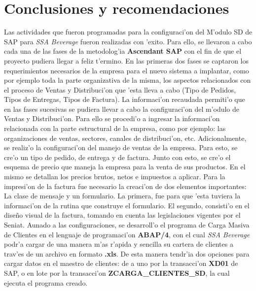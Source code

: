 \chapter{Conclusiones y recomendaciones} \label{chap:conclusiones}

	Las actividades que fueron programadas para la configuraci'on del M'odulo SD de SAP para \textit{SSA Beverage} fueron realizadas con 'exito. Para ello, se llevaron a cabo cada una de las fases de la metodolog'ia \textbf{Ascendant SAP} con el fin de que el proyecto pudiera llegar a feliz t'ermino.  En las primeras dos fases se captaron los requerimientos necesarios de la empresa para el nuevo sistema a implantar, como por ejemplo toda la parte organizativa de la misma, los aspectos relacionados con el proceso de Ventas y Distribuci'on que 'esta lleva a cabo (Tipo de Pedidos, Tipos de Entregas, Tipos de Factura). 
\newline
\newline
\indent La informaci'on recaudada permiti'o que en las fases sucesivas se pudiera llevar a cabo la configuraci'on del m'odulo de Ventas y Distribuci'on. Para ello se procedi'o a ingresar la informaci'on relacionada con la parte estructural de la empresa, como por ejemplo: las organizaciones de ventas, sectores, canales de distribuci'on, etc. Adicionalmente, se realiz'o la configuraci'on del manejo de ventas de la empresa. Para esto, se cre'o un tipo de pedido, de entrega y de factura. Junto con esto, se cre'o el esquema de precio que maneja la empresa para la venta de sus productos. En el mismo se detallan los precios brutos, netos e impuestos a aplicar. Para la impresi'on de la factura fue necesario la creaci'on de dos elementos importantes: La clase de mensaje y un formulario. La primera, fue para que 'esta tuviera la informaci'on de la rutina que construye el formulario. El segundo, consisti'o en el dise\~no visual de la factura, tomando en cuenta las legislaciones vigentes por el Seniat.
\newline
\newline
\indent Aunado a las configuraciones, se desarroll'o el programa de Carga Masiva de Clientes en el lenguaje de programaci'on \textbf{ABAP/4}, con el cual \textit{SSA Beverage} podr'a cargar de una manera m'as r'apida y sencilla su cartera de clientes a trav'es de un archivo en formato \textbf{.xls}. De esta manera tendr'ia dos opciones para cargar datos en el maestro de clientes: de a uno por la transacci'on \textbf{XD01} de SAP, o en lote por la transacci'on \textbf{ZCARGA\_CLIENTES\_SD}, la cual ejecuta el programa creado.
